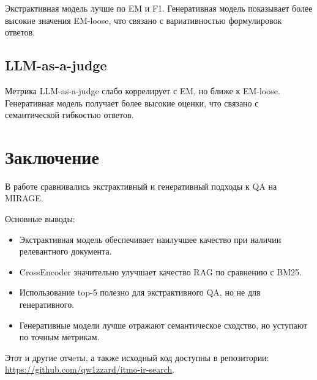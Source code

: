 \documentclass[11pt]{article}
\begin{document}
Экстрактивная модель лучше по EM и F1.
Генеративная модель показывает более высокие значения EM-loose,
что связано с вариативностью формулировок ответов.

\subsection{LLM-as-a-judge}

Метрика LLM-as-a-judge слабо коррелирует с EM,
но ближе к EM-loose. Генеративная модель получает более высокие оценки,
что связано с семантической гибкостью ответов.

\section{Заключение}

В работе сравнивались экстрактивный и генеративный подходы к QA на MIRAGE.

Основные выводы:
\begin{itemize}
\item Экстрактивная модель обеспечивает наилучшее качество при наличии
      релевантного документа.
\item CrossEncoder значительно улучшает качество RAG по сравнению с BM25.
\item Использование top-5 полезно для экстрактивного QA, но не для генеративного.
\item Генеративные модели лучше отражают семантическое сходство,
      но уступают по точным метрикам.
\end{itemize}

Этот и другие отчeты, а также исходный код доступны в репозитории:
\url{https://github.com/qw1zzard/itmo-ir-search}.
\end{document}
